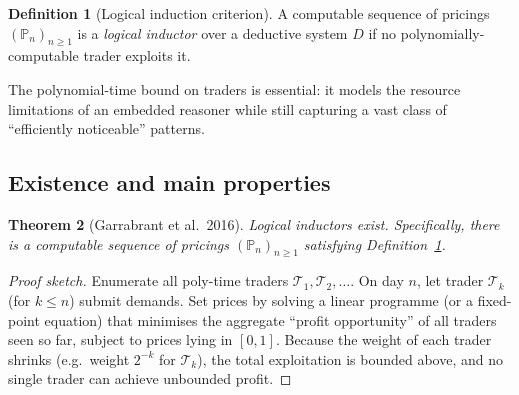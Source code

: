 \documentclass[11pt,a4paper]{article}
\newtheorem{theorem}{Theorem}[section]
\theoremstyle{definition}
\newtheorem{definition}[theorem]{Definition}
\theoremstyle{remark}
\begin{document}
\begin{definition}[Logical induction criterion]\label{def:lic}
A computable sequence of pricings $(\mathbb{P}_n)_{n \geq 1}$ is a
\emph{logical inductor} over a deductive system $D$ if no
polynomially-computable trader exploits it.
\end{definition}

The polynomial-time bound on traders is essential: it models the
resource limitations of an embedded reasoner while still capturing a
vast class of ``efficiently noticeable'' patterns.

\subsection{Existence and main properties}

\begin{theorem}[Garrabrant et al.\ 2016]\label{thm:li-existence}
Logical inductors exist.  Specifically, there is a computable sequence
of pricings $(\mathbb{P}_n)_{n \geq 1}$ satisfying
Definition~\ref{def:lic}.
\end{theorem}

\begin{proof}[Proof sketch]
Enumerate all poly-time traders $\mathcal{T}_1, \mathcal{T}_2, \ldots$.
On day $n$, let trader $\mathcal{T}_k$ (for $k \leq n$) submit demands.
Set prices by solving a linear programme (or a fixed-point equation)
that minimises the aggregate ``profit opportunity'' of all traders seen
so far, subject to prices lying in $[0,1]$.  Because the weight of each
trader shrinks (e.g.\ weight $2^{-k}$ for $\mathcal{T}_k$), the total
exploitation is bounded above, and no single trader can achieve
unbounded profit.
\end{proof}
\end{document}
